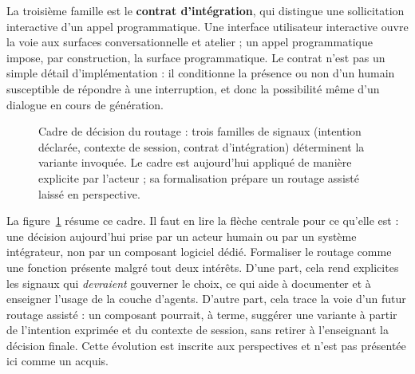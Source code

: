 La troisième famille est le \textbf{contrat d'intégration}, qui
distingue une sollicitation interactive d'un appel programmatique. Une
interface utilisateur interactive ouvre la voie aux surfaces
conversationnelle et atelier ; un appel programmatique impose, par
construction, la surface programmatique. Le contrat n'est pas un
simple détail d'implémentation : il conditionne la présence ou non
d'un humain susceptible de répondre à une interruption, et donc la
possibilité même d'un dialogue en cours de génération.

\begin{figure}[H]
\centering
{}
\caption{Cadre de décision du routage : trois familles de signaux
  (intention déclarée, contexte de session, contrat d'intégration)
  déterminent la variante invoquée. Le cadre est aujourd'hui appliqué
  de manière explicite par l'acteur ; sa formalisation prépare un
  routage assisté laissé en perspective.}
\label{fig:routage}
\end{figure}

La figure~\ref{fig:routage} résume ce cadre. Il faut en lire la
flèche centrale pour ce qu'elle est : une décision aujourd'hui prise
par un acteur humain ou par un système intégrateur, non par un
composant logiciel dédié. Formaliser le routage comme une fonction
présente malgré tout deux intérêts. D'une part, cela rend explicites
les signaux qui \emph{devraient} gouverner le choix, ce qui aide à
documenter et à enseigner l'usage de la couche d'agents. D'autre part,
cela trace la voie d'un futur routage assisté : un composant pourrait,
à terme, suggérer une variante à partir de l'intention exprimée et du
contexte de session, sans retirer à l'enseignant la décision finale.
Cette évolution est inscrite aux perspectives et n'est pas présentée
ici comme un acquis.


